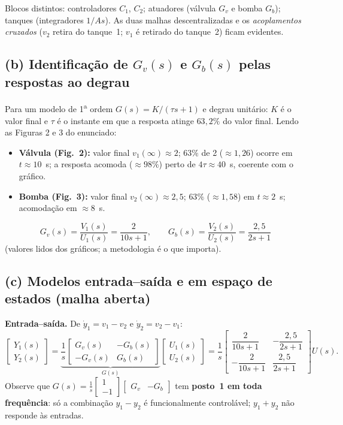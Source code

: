 \documentclass[11pt,a4paper]{article}
\begin{document}
Blocos distintos: controladores $C_1$, $C_2$; atuadores (v\'alvula $G_v$ e bomba
$G_b$); tanques (integradores $1/As$). As duas malhas descentralizadas e os
\emph{acoplamentos cruzados} ($v_2$ retira do tanque~1; $v_1$ \'e retirado do
tanque~2) ficam evidentes.

\subsection*{(b) Identifica\c{c}\~ao de $G_v(s)$ e $G_b(s)$ pelas respostas ao degrau}

Para um modelo de 1\textsuperscript{a} ordem $G(s)=K/(\tau s+1)$ e degrau
unit\'ario: $K$ \'e o valor final e $\tau$ \'e o instante em que a resposta atinge
$63{,}2\%$ do valor final. Lendo as Figuras 2 e 3 do enunciado:
\begin{itemize}[itemsep=1pt]
\item \textbf{V\'alvula (Fig.~2):} valor final $v_1(\infty)\approx2$; $63\%$ de 2
($\approx1{,}26$) ocorre em $t\approx10$~s; a resposta acomoda ($\approx98\%$)
perto de $4\tau\approx40$~s, coerente com o gr\'afico.
\item \textbf{Bomba (Fig.~3):} valor final $v_2(\infty)\approx2{,}5$; $63\%$
($\approx1{,}58$) em $t\approx2$~s; acomoda\c{c}\~ao em ${\approx}8$~s.
\end{itemize}
\[
\boxed{\;
G_v(s)=\frac{V_1(s)}{U_1(s)}=\frac{2}{10s+1},
\qquad
G_b(s)=\frac{V_2(s)}{U_2(s)}=\frac{2{,}5}{2s+1}\;}
\]
(valores lidos dos gr\'aficos; a metodologia \'e o que importa).

\subsection*{(c) Modelos entrada--sa\'ida e em espa\c{c}o de estados (malha aberta)}

\textbf{Entrada--sa\'ida.} De $\dot y_1=v_1-v_2$ e $\dot y_2=v_2-v_1$:
\[
\begin{bmatrix}Y_1(s)\\[1mm] Y_2(s)\end{bmatrix}
=\underbrace{\frac1s
\begin{bmatrix} G_v(s) & -G_b(s)\\[1mm] -G_v(s) & G_b(s)\end{bmatrix}}_{G(s)}
\begin{bmatrix}U_1(s)\\[1mm] U_2(s)\end{bmatrix}
=\frac1s\begin{bmatrix}\dfrac{2}{10s+1} & -\dfrac{2{,}5}{2s+1}\\[3mm]
-\dfrac{2}{10s+1} & \dfrac{2{,}5}{2s+1}\end{bmatrix}U(s) .
\]
Observe que
$G(s)=\frac1s\begin{bmatrix}1\\-1\end{bmatrix}\!\begin{bmatrix}G_v&-G_b\end{bmatrix}$
tem \textbf{posto~1 em toda frequ\^encia}: s\'o a combina\c{c}\~ao
$y_1-y_2$ \'e funcionalmente control\'avel; $y_1+y_2$ n\~ao responde \`as entradas.
\end{document}
